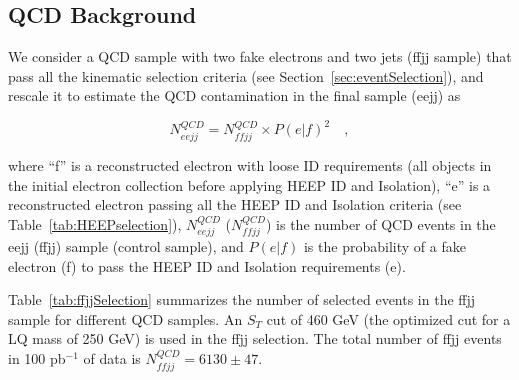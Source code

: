 \documentclass{cmspaper}
\begin{document}
\begin{linenumbers}
%
%

\subsection{QCD Background} \label{sec:QCDBackground}

We consider a QCD sample with two fake electrons and two jets (ffjj sample)
that pass all the kinematic selection criteria (see Section~\ref{sec:eventSelection}), and rescale it to estimate 
the QCD contamination in the final sample (eejj) as

%
\begin{equation} \label{QCDRescaling}
N_{eejj}^{QCD} = N_{ffjj}^{QCD} \times {P(e|f)}^2 \quad , 
\end{equation}
%

where ``f'' is a reconstructed electron with loose ID requirements (all objects in the initial electron collection 
before applying HEEP ID and Isolation), 
``e'' is a reconstructed electron passing all the HEEP ID and Isolation criteria (see Table~\ref{tab:HEEPselection}), 
$N_{eejj}^{QCD}$ ($N_{ffjj}^{QCD}$) is the number of QCD events in the eejj (ffjj) sample (control sample), 
and $P(e|f)$ is the probability of a fake electron (f) to pass the HEEP ID and Isolation requirements (e).

Table~\ref{tab:ffjjSelection} summarizes 
the number of selected events in the ffjj sample for different QCD samples.
An $S_{T}$ cut of 460 GeV 
(the optimized cut for a LQ mass of 250 GeV) is used in the ffjj selection.
The total number of ffjj events in 100 pb$^{-1}$ of data is $N_{ffjj}^{QCD}=6130 \pm 47$.


\end{linenumbers}
\end{document}
